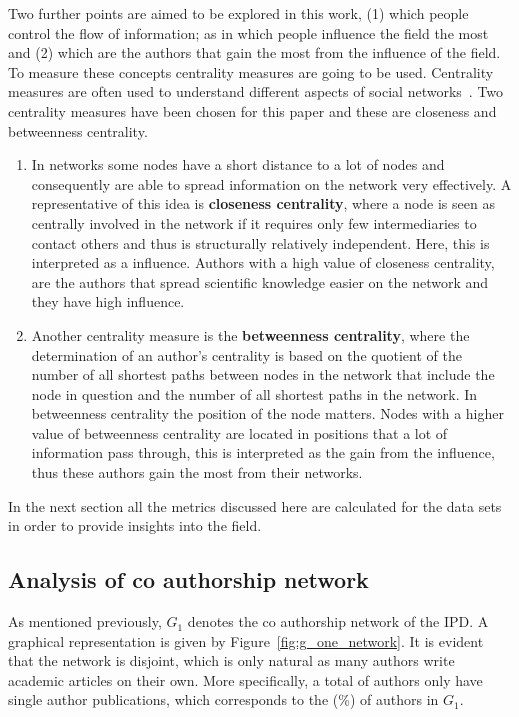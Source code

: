 \documentclass{article}
\theoremstyle{definition}
\newcommand{\isolated}{}
\newcommand{\isolatedpercentage}{}
\begin{document}
Two further points are aimed to be explored in this work, (1) which people control the flow
of information;
as in which people influence the field the most and (2) which are the authors that
gain the most from the influence of the field. To measure these concepts
centrality measures are going to be used.
Centrality measures are often used to understand different
aspects of social networks~\cite{Landherr2010}. Two centrality measures have been
chosen for this paper and these are closeness and betweenness centrality.

\begin{enumerate}
    \item In networks some nodes have a short distance to a lot of nodes and
    consequently are able to spread information on the network very effectively.
    A representative of this idea is \textbf{closeness centrality}, where a node
    is seen as centrally involved in the network if it requires only few
    intermediaries to contact others and thus is structurally relatively
    independent. Here, this is interpreted as a influence. Authors with a high
    value of closeness centrality, are the authors that spread scientific
    knowledge easier on the network and they have high influence.
    \item Another centrality measure is the \textbf{betweenness centrality},
    where the determination of an author's centrality is based on the quotient
    of the number of all shortest paths between nodes in the network that
    include the node in question and the number of all shortest paths in the
    network. In betweenness centrality the position of the node matters. Nodes
    with a higher value of betweenness centrality are located in positions that
    a lot of information pass through, this is interpreted as the gain from
    the influence, thus these authors gain the most from their networks.
\end{enumerate}

In the next section all the metrics discussed here are calculated for the data
sets in order to provide insights into the field.

\subsection{Analysis of co authorship network}\label{section:results}

As mentioned previously, \(G_1\) denotes the co authorship network of the
IPD. A graphical representation is given by
Figure~\ref{fig:g_one_network}. It is evident that the network is disjoint,
which is only natural as many authors write academic articles on their own. More
specifically, a total of \isolated authors only have single author publications,
which corresponds to the \isolatedpercentage (\%) of authors in \(G_1\).
\end{document}
